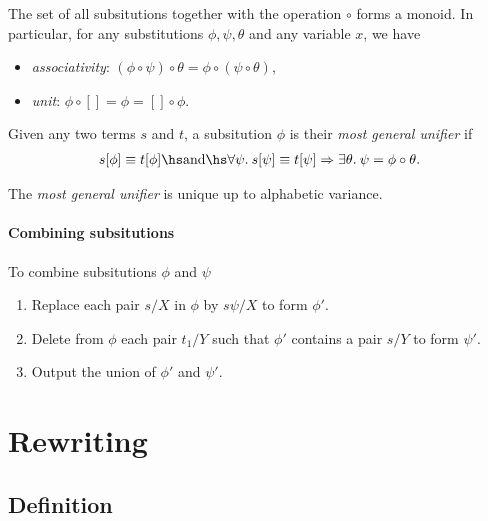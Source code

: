\documentclass{article}
\begin{document}
\begin{theorem}
    The set of all subsitutions together with the operation $\circ$ forms a monoid. In particular,
    for any substitutions $\phi,\psi,\theta$ and any variable $x$, we have
    \begin{itemize}
        \item \emph{associativity}: $(\phi \circ \psi) \circ \theta = \phi \circ (\psi \circ \theta)$,
        \item \emph{unit}: $\phi\circ[] = \phi = []\circ\phi$.
    \end{itemize}
\end{theorem}

\begin{definition}
    Given any two terms $s$ and $t$, a subsitution $\phi$ is their \emph{most general unifier}
    if
    \begin{align*}
        s[\phi]\equiv t[\phi] \hs\text{and}\hs
        \forall \psi.\: s[\psi] \equiv t[\psi]  \Rightarrow \exists \theta.\: \psi = \phi \circ \theta.
    \end{align*}
\end{definition}

\begin{theorem}
    The \emph{most general unifier} is unique up to alphabetic variance.
\end{theorem}

\paragraph{Combining subsitutions}

To combine subsitutions $\phi$ and $\psi$
\begin{enumerate}
    \item Replace each pair $s/X$ in $\phi$ by $s\psi/X$ to form $\phi'$.
    \item Delete from $\phi$ each pair $t_1/Y$ such that $\phi'$ contains a pair $s/Y$ to form $\psi'$.
    \item Output the union of $\phi'$ and $\psi'$.
\end{enumerate}

\section{Rewriting}

\subsection{Definition}
\end{document}

